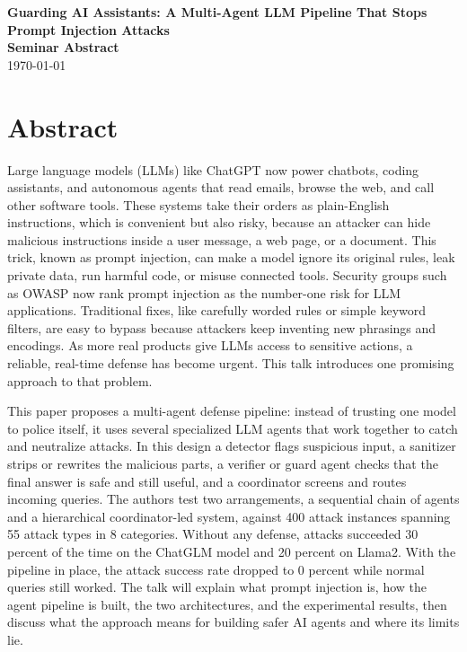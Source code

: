 \documentclass[12pt]{article}
\newcommand{\seminardate}{\today}
\begin{document}
\begin{center}
  {\LARGE\bfseries Guarding AI Assistants: A Multi-Agent LLM Pipeline That Stops Prompt Injection Attacks}\\[8pt]
  {\large\bfseries Seminar Abstract}\\[6pt]
  {\normalsize \seminardate}
\end{center}
\vspace{1.5em}

\section*{Abstract}
Large language models (LLMs) like ChatGPT now power chatbots, coding assistants, and autonomous agents that read emails, browse the web, and call other software tools. These systems take their orders as plain-English instructions, which is convenient but also risky, because an attacker can hide malicious instructions inside a user message, a web page, or a document. This trick, known as prompt injection, can make a model ignore its original rules, leak private data, run harmful code, or misuse connected tools. Security groups such as OWASP now rank prompt injection as the number-one risk for LLM applications. Traditional fixes, like carefully worded rules or simple keyword filters, are easy to bypass because attackers keep inventing new phrasings and encodings. As more real products give LLMs access to sensitive actions, a reliable, real-time defense has become urgent. This talk introduces one promising approach to that problem.

This paper proposes a multi-agent defense pipeline: instead of trusting one model to police itself, it uses several specialized LLM agents that work together to catch and neutralize attacks. In this design a detector flags suspicious input, a sanitizer strips or rewrites the malicious parts, a verifier or guard agent checks that the final answer is safe and still useful, and a coordinator screens and routes incoming queries. The authors test two arrangements, a sequential chain of agents and a hierarchical coordinator-led system, against 400 attack instances spanning 55 attack types in 8 categories. Without any defense, attacks succeeded 30 percent of the time on the ChatGLM model and 20 percent on Llama2. With the pipeline in place, the attack success rate dropped to 0 percent while normal queries still worked. The talk will explain what prompt injection is, how the agent pipeline is built, the two architectures, and the experimental results, then discuss what the approach means for building safer AI agents and where its limits lie.
\end{document}
